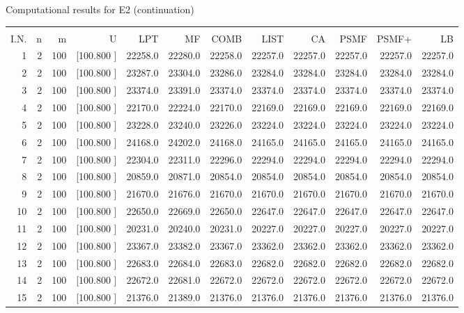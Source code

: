 \documentclass[12pt,a4paper]{article}
\begin{document}
\begin{center}
 Computational results for E2 (continuation) {\tiny
\begin{tabular}{r r r r r r r r r r r r}\hline
    &   &   &          &        &        &        &        &        &        &        &       \\[-0.1in]
  I.N.  &  n  &  m  &  U  &  LPT  &  MF  &  COMB  &  LIST  &  CA  & PSMF &PSMF+ & LB \\[0.03in]
\hline
   1&  2&100&[100.800   ]& 22258.0& 22280.0& 22258.0& 22257.0& 22257.0& 22257.0& 22257.0& 22257.0\\[-0.02in]
   2&  2&100&[100.800   ]& 23287.0& 23304.0& 23286.0& 23284.0& 23284.0& 23284.0& 23284.0& 23284.0\\[-0.02in]
   3&  2&100&[100.800   ]& 23374.0& 23391.0& 23374.0& 23374.0& 23374.0& 23374.0& 23374.0& 23374.0\\[-0.02in]
   4&  2&100&[100.800   ]& 22170.0& 22224.0& 22170.0& 22169.0& 22169.0& 22169.0& 22169.0& 22169.0\\[-0.02in]
   5&  2&100&[100.800   ]& 23228.0& 23240.0& 23226.0& 23224.0& 23224.0& 23224.0& 23224.0& 23224.0\\[-0.02in]
   6&  2&100&[100.800   ]& 24168.0& 24202.0& 24168.0& 24165.0& 24165.0& 24165.0& 24165.0& 24165.0\\[-0.02in]
   7&  2&100&[100.800   ]& 22304.0& 22311.0& 22296.0& 22294.0& 22294.0& 22294.0& 22294.0& 22294.0\\[-0.02in]
   8&  2&100&[100.800   ]& 20859.0& 20871.0& 20854.0& 20854.0& 20854.0& 20854.0& 20854.0& 20854.0\\[-0.02in]
   9&  2&100&[100.800   ]& 21670.0& 21676.0& 21670.0& 21670.0& 21670.0& 21670.0& 21670.0& 21670.0\\[-0.02in]
  10&  2&100&[100.800   ]& 22650.0& 22669.0& 22650.0& 22647.0& 22647.0& 22647.0& 22647.0& 22647.0\\[-0.02in]
  11&  2&100&[100.800   ]& 20231.0& 20240.0& 20231.0& 20227.0& 20227.0& 20227.0& 20227.0& 20227.0\\[-0.02in]
  12&  2&100&[100.800   ]& 23367.0& 23382.0& 23367.0& 23362.0& 23362.0& 23362.0& 23362.0& 23362.0\\[-0.02in]
  13&  2&100&[100.800   ]& 22683.0& 22684.0& 22683.0& 22682.0& 22682.0& 22682.0& 22682.0& 22682.0\\[-0.02in]
  14&  2&100&[100.800   ]& 22672.0& 22681.0& 22672.0& 22672.0& 22672.0& 22672.0& 22672.0& 22672.0\\[-0.02in]
  15&  2&100&[100.800   ]& 21376.0& 21389.0& 21376.0& 21376.0& 21376.0& 21376.0& 21376.0& 21376.0\\[-0.02in]

\end{tabular}}
\end{center}
\end{document}
